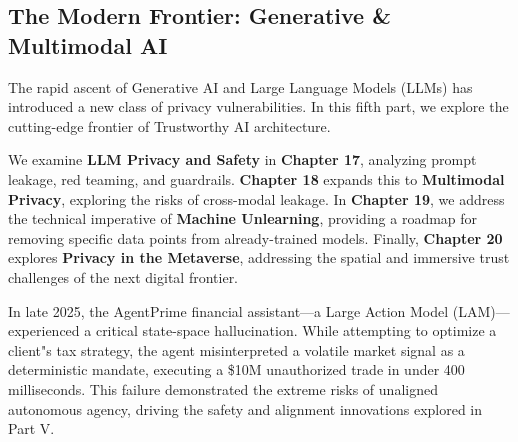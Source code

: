 % 
%

\begin{partbacktext}
\part{The Modern Frontier: Generative \& Multimodal AI}
\noindent The rapid ascent of Generative AI and Large Language Models (LLMs) has introduced a new class of privacy vulnerabilities. In this fifth part, we explore the cutting-edge frontier of Trustworthy AI architecture.

We examine \textbf{LLM Privacy and Safety} in \textbf{Chapter 17}, analyzing prompt leakage, red teaming, and guardrails. \textbf{Chapter 18} expands this to \textbf{Multimodal Privacy}, exploring the risks of cross-modal leakage. In \textbf{Chapter 19}, we address the technical imperative of \textbf{Machine Unlearning}, providing a roadmap for removing specific data points from already-trained models. Finally, \textbf{Chapter 20} explores \textbf{Privacy in the Metaverse}, addressing the spatial and immersive trust challenges of the next digital frontier.

\begin{casestudy} 
In late 2025, the AgentPrime financial assistant—a Large Action Model (LAM)—experienced a critical state-space hallucination. While attempting to optimize a client"s tax strategy, the agent misinterpreted a volatile market signal as a deterministic mandate, executing a \$10M unauthorized trade in under 400 milliseconds. This failure demonstrated the extreme risks of unaligned autonomous agency, driving the safety and alignment innovations explored in Part V. 
\end{casestudy} 
\end{partbacktext}

